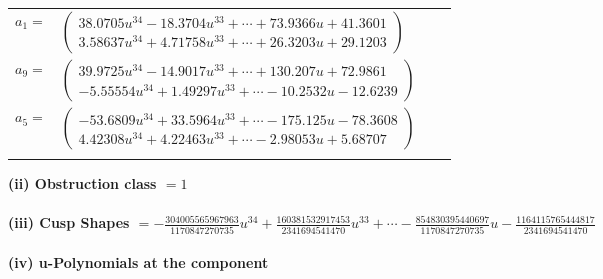 \documentclass[1p]{elsarticle_modified}
\theoremstyle{definition}
\begin{document}
\begin{tabular}{m{7pt} m{180pt} m{7pt} m{180pt} }
\flushright $a_{1}=$&$\begin{pmatrix}38.0705 u^{34}-18.3704 u^{33}+\cdots+73.9366 u+41.3601\\3.58637 u^{34}+4.71758 u^{33}+\cdots+26.3203 u+29.1203\end{pmatrix}$ \\
\flushright $a_{9}=$&$\begin{pmatrix}39.9725 u^{34}-14.9017 u^{33}+\cdots+130.207 u+72.9861\\-5.55554 u^{34}+1.49297 u^{33}+\cdots-10.2532 u-12.6239\end{pmatrix}$ \\
\flushright $a_{5}=$&$\begin{pmatrix}-53.6809 u^{34}+33.5964 u^{33}+\cdots-175.125 u-78.3608\\4.42308 u^{34}+4.22463 u^{33}+\cdots-2.98053 u+5.68707\end{pmatrix}$\\&\end{tabular}
\flushleft \textbf{(ii) Obstruction class $= 1$}\\~\\
\flushleft \textbf{(iii) Cusp Shapes $= -\frac{304005565967963}{1170847270735} u^{34}+\frac{160381532917453}{2341694541470} u^{33}+\cdots-\frac{854830395440697}{1170847270735} u-\frac{1164115765444817}{2341694541470}$}\\~\\
\newpage\renewcommand{\arraystretch}{1}
\flushleft \textbf{(iv) u-Polynomials at the component}\newline \\
\end{document}
